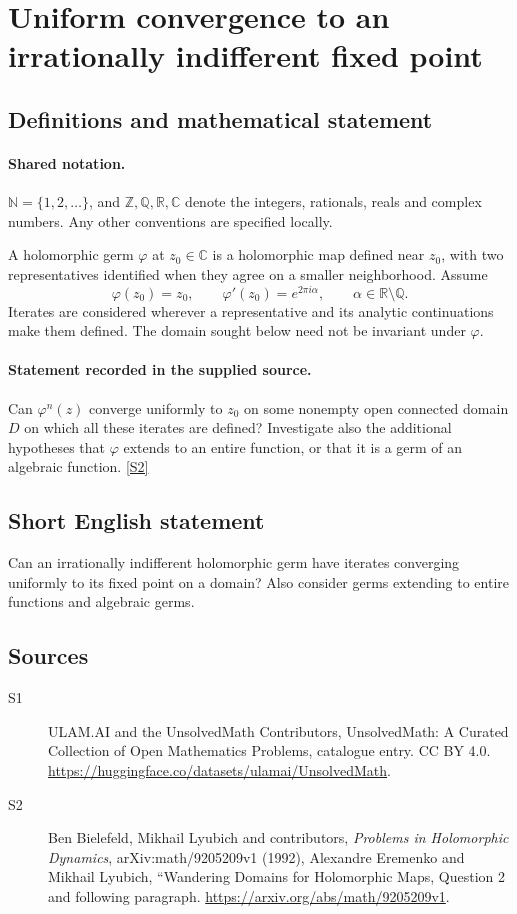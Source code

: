 \documentclass[11pt]{article}
\newcommand{\sref}[2]{\hyperlink{source:#1:#2}{[S#2]}}
\begin{document}
\section{Uniform convergence to an irrationally indifferent fixed point}\label{statement}

\subsection{Definitions and mathematical statement}

\paragraph{Shared notation.}$\mathbb N=\{1,2,\ldots\}$, and $\mathbb Z,\mathbb Q,\mathbb R,\mathbb C$ denote the integers, rationals, reals and complex numbers. Any other conventions are specified locally.


A holomorphic germ $\varphi$ at $z_0\in\mathbb C$ is a holomorphic map defined near $z_0$, with two representatives identified when they agree on a smaller neighborhood. Assume
\[\varphi(z_0)=z_0,\qquad \varphi'(z_0)=e^{2\pi i\alpha},\qquad \alpha\in\mathbb R\setminus\mathbb Q.\]
Iterates are considered wherever a representative and its analytic continuations make them defined. The domain sought below need not be invariant under $\varphi$.
\paragraph{Statement recorded in the supplied source.}
Can $\varphi^n(z)$ converge uniformly to $z_0$ on some nonempty open connected domain $D$ on which all these iterates are defined? Investigate also the additional hypotheses that $\varphi$ extends to an entire function, or that it is a germ of an algebraic function. \sref{statement}{2}
\subsection{Short English statement}
Can an irrationally indifferent holomorphic germ have iterates converging uniformly to its fixed point on a domain? Also consider germs extending to entire functions and algebraic germs.
\subsection{Sources}
\begin{description}
\item[\hypertarget{source:statement:1}{S1}] ULAM.AI and the UnsolvedMath Contributors, UnsolvedMath: A Curated Collection of Open Mathematics Problems, catalogue entry. CC BY 4.0. \url{https://huggingface.co/datasets/ulamai/UnsolvedMath}.
\item[\hypertarget{source:statement:2}{S2}] Ben Bielefeld, Mikhail Lyubich and contributors, \emph{Problems in Holomorphic Dynamics}, arXiv:math/9205209v1 (1992), Alexandre Eremenko and Mikhail Lyubich, ``Wandering Domains for Holomorphic Maps, Question 2 and following paragraph. \url{https://arxiv.org/abs/math/9205209v1}.
\end{description}
\label{end:statement}
\end{document}
